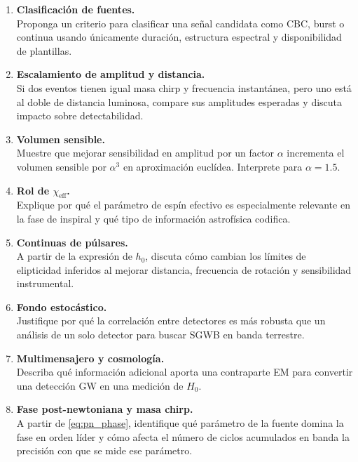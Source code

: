 \begin{enumerate}[leftmargin=2.2em, label=\textbf{P\arabic*.}]

\item \textbf{Clasificación de fuentes.} \\
Proponga un criterio para clasificar una señal candidata como CBC, burst o continua usando únicamente duración, estructura espectral y disponibilidad de plantillas.

\item \textbf{Escalamiento de amplitud y distancia.} \\
Si dos eventos tienen igual masa chirp y frecuencia instantánea, pero uno está al doble de distancia luminosa, compare sus amplitudes esperadas y discuta impacto sobre detectabilidad.

\item \textbf{Volumen sensible.} \\
Muestre que mejorar sensibilidad en amplitud por un factor $\alpha$ incrementa el volumen sensible por $\alpha^3$ en aproximación euclídea. Interprete para $\alpha=1.5$.

\item \textbf{Rol de $\chi_{\mathrm{eff}}$.} \\
Explique por qué el parámetro de espín efectivo es especialmente relevante en la fase de inspiral y qué tipo de información astrofísica codifica.

\item \textbf{Continuas de púlsares.} \\
A partir de la expresión de $h_0$, discuta cómo cambian los límites de elipticidad inferidos al mejorar distancia, frecuencia de rotación y sensibilidad instrumental.

\item \textbf{Fondo estocástico.} \\
Justifique por qué la correlación entre detectores es más robusta que un análisis de un solo detector para buscar SGWB en banda terrestre.

\item \textbf{Multimensajero y cosmología.} \\
Describa qué información adicional aporta una contraparte EM para convertir una detección GW en una medición de $H_0$.

\item \textbf{Fase post-newtoniana y masa chirp.} \\
A partir de \eqref{eq:pn_phase}, identifique qué parámetro de la fuente domina la fase en orden líder y cómo afecta el número de ciclos acumulados en banda la precisión con que se mide ese parámetro.


\end{enumerate}
